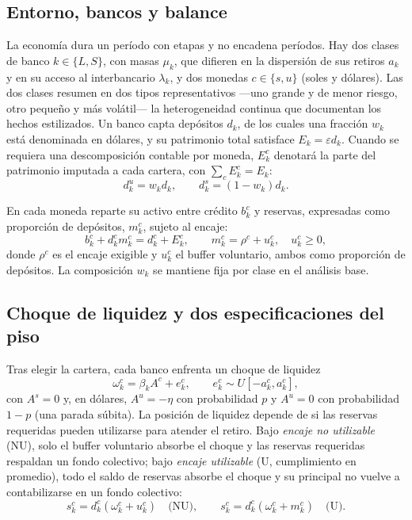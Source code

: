 \documentclass[11pt,a4paper]{article}
\begin{document}
\subsection{Entorno, bancos y balance}

La economía dura un período con etapas y no encadena períodos. Hay dos clases de banco $k\in\{L,S\}$, con masas $\mu_k$, que difieren en la dispersión de sus retiros $a_k$ y en su acceso al interbancario $\lambda_k$, y dos monedas $c\in\{s,u\}$ (soles y dólares). Las dos clases resumen en dos tipos representativos ---uno grande y de menor riesgo, otro pequeño y más volátil--- la heterogeneidad continua que documentan los hechos estilizados. Un banco capta depósitos $d_k$, de los cuales una fracción $w_k$ está denominada en dólares, y su patrimonio total satisface $E_k=\varepsilon d_k$. Cuando se requiera una descomposición contable por moneda, $E_k^c$ denotará la parte del patrimonio imputada a cada cartera, con $\sum_c E_k^c=E_k$:
\begin{equation}
d^u_k=w_kd_k,\qquad d^s_k=(1-w_k)d_k.
\end{equation}

En cada moneda reparte su activo entre crédito $b^c_k$ y reservas, expresadas como proporción de depósitos, $m^c_k$, sujeto al encaje:
\begin{equation}
b^c_k+d^c_km^c_k=d^c_k+E^c_k,\qquad
m^c_k=\rho^c+u^c_k,\quad u^c_k\geq 0,
\end{equation}
donde $\rho^c$ es el encaje exigible y $u^c_k$ el buffer voluntario, ambos como proporción de depósitos. La composición $w_k$ se mantiene fija por clase en el análisis base.

\subsection{Choque de liquidez y dos especificaciones del piso}

Tras elegir la cartera, cada banco enfrenta un choque de liquidez
\begin{equation}
\omega^c_k=\beta_k A^c+e^c_k,\qquad
e^c_k\sim U[-a_k^c,a_k^c],
\end{equation}
con $A^s=0$ y, en dólares, $A^u=-\eta$ con probabilidad $p$ y $A^u=0$ con probabilidad $1-p$ (una parada súbita). La posición de liquidez depende de si las reservas requeridas pueden utilizarse para atender el retiro. Bajo \emph{encaje no utilizable} (NU), solo el buffer voluntario absorbe el choque y las reservas requeridas respaldan un fondo colectivo; bajo \emph{encaje utilizable} (U, cumplimiento en promedio), todo el saldo de reservas absorbe el choque y su principal no vuelve a contabilizarse en un fondo colectivo:
\begin{equation}
s^c_k=d^c_k(\omega^c_k+u^c_k)\quad\text{(NU)},\qquad
s^c_k=d^c_k(\omega^c_k+m^c_k)\quad\text{(U)}.
\end{equation}
\end{document}
